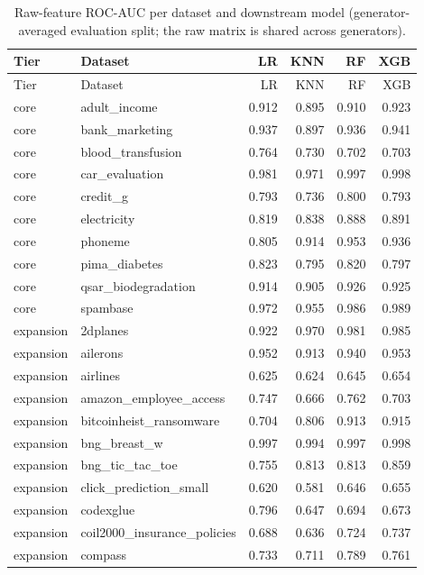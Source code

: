 \begin{longtable}{llrrrr}
\caption{Raw-feature ROC-AUC per dataset and downstream model (generator-averaged evaluation split; the raw matrix is shared across generators).}\label{tab:raw-scores}\\
\toprule
Tier & Dataset & LR & KNN & RF & XGB \\
\midrule
\endfirsthead
\toprule
Tier & Dataset & LR & KNN & RF & XGB \\
\midrule
\endhead
\bottomrule
\endfoot
core & adult\_income & 0.912 & 0.895 & 0.910 & 0.923 \\
core & bank\_marketing & 0.937 & 0.897 & 0.936 & 0.941 \\
core & blood\_transfusion & 0.764 & 0.730 & 0.702 & 0.703 \\
core & car\_evaluation & 0.981 & 0.971 & 0.997 & 0.998 \\
core & credit\_g & 0.793 & 0.736 & 0.800 & 0.793 \\
core & electricity & 0.819 & 0.838 & 0.888 & 0.891 \\
core & phoneme & 0.805 & 0.914 & 0.953 & 0.936 \\
core & pima\_diabetes & 0.823 & 0.795 & 0.820 & 0.797 \\
core & qsar\_biodegradation & 0.914 & 0.905 & 0.926 & 0.925 \\
core & spambase & 0.972 & 0.955 & 0.986 & 0.989 \\
expansion & 2dplanes & 0.922 & 0.970 & 0.981 & 0.985 \\
expansion & ailerons & 0.952 & 0.913 & 0.940 & 0.953 \\
expansion & airlines & 0.625 & 0.624 & 0.645 & 0.654 \\
expansion & amazon\_employee\_access & 0.747 & 0.666 & 0.762 & 0.703 \\
expansion & bitcoinheist\_ransomware & 0.704 & 0.806 & 0.913 & 0.915 \\
expansion & bng\_breast\_w & 0.997 & 0.994 & 0.997 & 0.998 \\
expansion & bng\_tic\_tac\_toe & 0.755 & 0.813 & 0.813 & 0.859 \\
expansion & click\_prediction\_small & 0.620 & 0.581 & 0.646 & 0.655 \\
expansion & codexglue & 0.796 & 0.647 & 0.694 & 0.673 \\
expansion & coil2000\_insurance\_policies & 0.688 & 0.636 & 0.724 & 0.737 \\
expansion & compass & 0.733 & 0.711 & 0.789 & 0.761 \\

\end{longtable}
